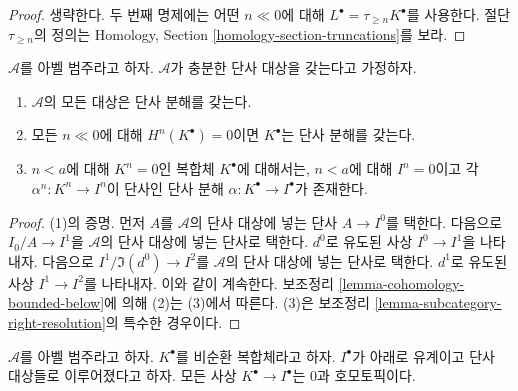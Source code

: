 \begin{proof}
생략한다. 두 번째 명제에는 어떤 $n \ll 0$에 대해
$L^\bullet = \tau_{\geq n}K^\bullet$를 사용한다.
절단 $\tau_{\geq n}$의 정의는 Homology, Section
\ref{homology-section-truncations}를 보라.
\end{proof}

\begin{lemma}
\label{lemma-injective-resolutions-exist}
$\mathcal{A}$를 아벨 범주라고 하자.
$\mathcal{A}$가 충분한 단사 대상을 갖는다고 가정하자.
\begin{enumerate}
\item $\mathcal{A}$의 모든 대상은 단사 분해를 갖는다.
\item 모든 $n \ll 0$에 대해 $H^n(K^\bullet) = 0$이면
$K^\bullet$는 단사 분해를 갖는다.
\item $n < a$에 대해 $K^n = 0$인 복합체 $K^\bullet$에 대해서는,
$n < a$에 대해 $I^n = 0$이고 각 $\alpha^n : K^n \to I^n$이 단사인
단사 분해 $\alpha : K^\bullet \to I^\bullet$가 존재한다.
\end{enumerate}
\end{lemma}

\begin{proof}
(1)의 증명. 먼저 $A$를 $\mathcal{A}$의 단사 대상에 넣는 단사
$A \to I^0$를 택한다. 다음으로
$I_0/A \to I^1$을 $\mathcal{A}$의 단사 대상에 넣는 단사로 택한다.
$d^0$로 유도된 사상 $I^0 \to I^1$을 나타내자. 다음으로
$I^1/\Im(d^0) \to I^2$를 $\mathcal{A}$의 단사 대상에 넣는 단사로 택한다.
$d^1$로 유도된 사상 $I^1 \to I^2$를 나타내자. 이와 같이 계속한다.
보조정리 \ref{lemma-cohomology-bounded-below}에 의해 (2)는 (3)에서 따른다.
(3)은 보조정리 \ref{lemma-subcategory-right-resolution}의 특수한 경우이다.
\end{proof}

\begin{lemma}
\label{lemma-acyclic-is-zero}
$\mathcal{A}$를 아벨 범주라고 하자.
$K^\bullet$를 비순환 복합체라고 하자.
$I^\bullet$가 아래로 유계이고 단사 대상들로 이루어졌다고 하자.
모든 사상 $K^\bullet \to I^\bullet$는 0과 호모토픽이다.
\end{lemma}

